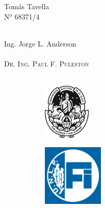 \begin{titlepage}
\begin{center}
            Tomás Tavella
            \\
            N° 68371/4
            \\
            \vspace{0.1cm}
            \LARGE\scshape
            \normalfont
            \\
            \begin{multicols}{2}
            \large\SemiBold
            Ing. Jorge L. Anderson
            \\
            \vspace{0.1cm}
            \LARGE\scshape
            \normalfont
            \\
            \columnbreak
            \vspace{0.6cm}
            \large\SemiBold
            Dr. Ing. Paul F. Puleston
            \\
            \vspace{0.1cm}
            \LARGE\scshape
            \normalfont
            \\
            \end{multicols}
            \vfill
            \begin{figure}[H]
                \centering
                \begin{subfigure}
                    \centering
                    \includegraphics[width=0.25\textwidth]{Imagenes/UNLP.pdf}
                \end{subfigure}
                \begin{subfigure}
                    \centering
                    \includegraphics[width=0.32\textwidth]{Imagenes/FI Invertido.png}

\end{subfigure}
\end{figure}
\end{center}
\end{titlepage}
